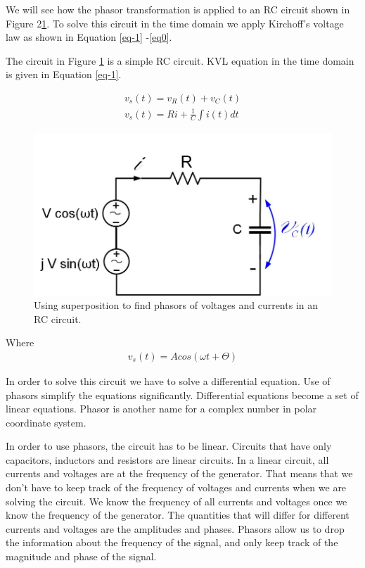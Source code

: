 \documentclass{ximera}
\begin{document}
\begin{example}

We will see how the phasor transformation is applied to an RC circuit shown in Figure 2\ref{RCcirc}.  To solve this circuit in the time domain we apply Kirchoff's voltage law as shown in Equation \ref{eq-1} -\ref{eq0}.


The circuit in Figure \ref{RCcirc} is a simple RC circuit. KVL equation in the time domain is given in Equation \ref{eq-1}.

\begin{eqnarray}
        v_s(t)=v_R(t)+v_C(t)                \label{eq-1}  \\
v_s(t) = R i + \frac{1}{C} \int i(t) dt \label{eq0}
\end{eqnarray} 


\begin{figure}[htbp]
\begin{center}
\includegraphics[scale=0.5]{../jpg/RCcircuitPhasorSup.jpg}
\end{center}
\caption{Using superposition to find phasors of voltages and currents in an RC circuit.}
\label{RCcirc}
\end{figure}




Where
\begin{eqnarray}
v_s(t)= A cos (\omega t + \Theta ) \label{eq1}
\end{eqnarray}

In order to solve this circuit we have to  solve a differential equation.
Use of phasors simplify the equations
significantly. Differential equations become a set of
linear equations.  Phasor is another name for a complex number  in polar coordinate system. 

In order to use phasors, the circuit has to be linear. Circuits that have  only capacitors, inductors and resistors are 
linear circuits.  In  a  linear circuit, all currents and voltages are  at the frequency of the generator. That means that we don't have to keep track  of the frequency of voltages and currents when we are solving the circuit. We know the frequency of all currents and voltages once we know the frequency of the generator. The quantities that will differ for different currents and voltages are the amplitudes and phases. Phasors allow us to drop the information about the frequency of the signal, and only  keep track of the magnitude and phase of the signal.



\end{example}
\end{document}
